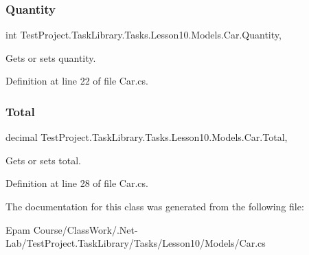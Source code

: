 \subsubsection{\texorpdfstring{Quantity}{Quantity}}
{\footnotesize\ttfamily int Test\+Project.\+Task\+Library.\+Tasks.\+Lesson10.\+Models.\+Car.\+Quantity\hspace{0.3cm}{\ttfamily [get]}, {\ttfamily [set]}}



Gets or sets quantity. 



Definition at line 22 of file Car.\+cs.

\mbox{\label{class_test_project_1_1_task_library_1_1_tasks_1_1_lesson10_1_1_models_1_1_car_ab717a111516a47377aa5f1e79c2ec8d7}} 
\subsubsection{\texorpdfstring{Total}{Total}}
{\footnotesize\ttfamily decimal Test\+Project.\+Task\+Library.\+Tasks.\+Lesson10.\+Models.\+Car.\+Total\hspace{0.3cm}{\ttfamily [get]}, {\ttfamily [set]}}



Gets or sets total. 



Definition at line 28 of file Car.\+cs.



The documentation for this class was generated from the following file\+:\begin{DoxyCompactItemize}
\item 
Epam Course/\+Class\+Work/.\+Net-\/\+Lab/\+Test\+Project.\+Task\+Library/\+Tasks/\+Lesson10/\+Models/Car.\+cs\end{DoxyCompactItemize}
